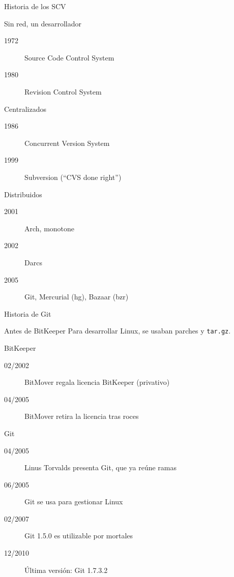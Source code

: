 \documentclass[xcolor=svgnames]{beamer}
\begin{document}
\begin{frame}{Historia de los SCV}

  \begin{block}{Sin red, un desarrollador}
    \begin{description}
    \item[1972] Source Code Control System
    \item[1980] Revision Control System
    \end{description}
  \end{block}

  \begin{block}{Centralizados}
    \begin{description}
    \item[1986] Concurrent Version System
    \item[1999] Subversion (\enquote{CVS done right})
    \end{description}
  \end{block}

  \begin{block}{Distribuidos}
    \begin{description}
    \item[2001] Arch, monotone
    \item[2002] Darcs
    \item[2005] Git, Mercurial (hg), Bazaar (bzr)
    \end{description}
  \end{block}

\end{frame}

\begin{frame}{Historia de Git}

  \begin{block}{Antes de BitKeeper}
    Para desarrollar Linux, se usaban parches y \texttt{tar.gz}.
  \end{block}

  \begin{block}{BitKeeper}
    \begin{description}
    \item[02/2002] BitMover regala licencia BitKeeper (privativo)
    \item[04/2005] BitMover retira la licencia tras roces
    \end{description}
  \end{block}

  \begin{block}{Git}
    \begin{description}
    \item[04/2005] Linus Torvalds presenta Git, que ya reúne ramas
    \item[06/2005] Git se usa para gestionar Linux
    \item[02/2007] Git 1.5.0 es utilizable por mortales
    \item[12/2010] Última versión: Git 1.7.3.2
    \end{description}
  \end{block}

\end{frame}
\end{document}
